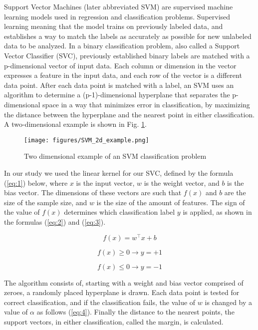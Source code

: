 \documentclass[review]{elsarticle}
\begin{document}
Support Vector Machines (later abbreviated SVM) are supervised machine learning models used in regression and classification problems ​\cite{35}. Supervised learning meaning that the model trains on previously labeled data, and establishes a way to match the labels as accurately as possible for new unlabeled data to be analyzed. In a binary classification problem, also called a Support Vector Classifier (SVC), previously established binary labels are matched with a p-dimensional vector of input data. Each column or dimension in the vector expresses a feature in the input data, and each row of the vector is a different data point. After each data point is matched with a label, an SVM uses an algorithm to determine a (p-1)-dimensional hyperplane that separates the p-dimensional space in a way that minimizes error in classification, by maximizing the distance between the hyperplane and the nearest point in either classification. A two-dimensional example is shown in Fig. \ref{fig:svm}.

\begin{figure}
\centering
\texttt{[image: figures/SVM\_2d\_example.png]}
\caption{Two dimensional example of an SVM classification problem}
\label{fig:svm}
\end{figure}

In our study we used the linear kernel for our SVC, defined by the formula (\ref{eq:1}) below, where \(x\) is the input vector, \(w\) is the weight vector, and \(b\) is the bias vector. The dimensions of these vectors are such that \(f(x)\) and \(b\) are the size of the sample size, and \(w\) is the size of the amount of features. The sign of the value of \(f(x)\) determines which classification label \(y\) is applied, as shown in the formulas (\ref{eq:2}) and (\ref{eq:3}). 

\begin{equation}\label{eq:1}
f(x) = w^\top x + b
\end{equation}

\begin{equation}\label{eq:2}
f(x)\geq 0 \rightarrow y= +1 
\end{equation}

\begin{equation}\label{eq:3}
f(x)\leq 0 \rightarrow y= -1 
\end{equation}

The algorithm consists of, starting with a weight and bias vector comprised of zeroes, a randomly placed hyperplane is drawn. Each data point is tested for correct classification, and if the classification fails, the value of \(w\) is changed by a value of \(\alpha\) as follows (\ref{eq:4}). Finally the distance to the nearest points, the support vectors,  in either classification, called the margin, is calculated.
\end{document}
